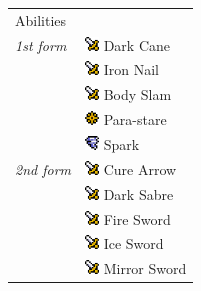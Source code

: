 \begin{longtable}{ l p{9cm} }
\\ \hline
	Abilities \\ \textit{1st form}
	& \includegraphics[height=1em,keepaspectratio]{./resources/effects/damage} Dark Cane \\
	& \includegraphics[height=1em,keepaspectratio]{./resources/effects/damage} Iron Nail \\
	& \includegraphics[height=1em,keepaspectratio]{./resources/effects/damage} Body Slam \\
	& \includegraphics[height=1em,keepaspectratio]{./resources/effects/paralyze} Para-stare \\
	& \includegraphics[height=1em,keepaspectratio]{./resources/effects/wind} Spark \\
	\textit{2nd form} & \includegraphics[height=1em,keepaspectratio]{./resources/effects/damage} Cure Arrow \\
	& \includegraphics[height=1em,keepaspectratio]{./resources/effects/damage} Dark Sabre \\
	& \includegraphics[height=1em,keepaspectratio]{./resources/effects/damage} Fire Sword \\
	& \includegraphics[height=1em,keepaspectratio]{./resources/effects/damage} Ice Sword \\
	& \includegraphics[height=1em,keepaspectratio]{./resources/effects/damage} Mirror Sword \\

\end{longtable}
